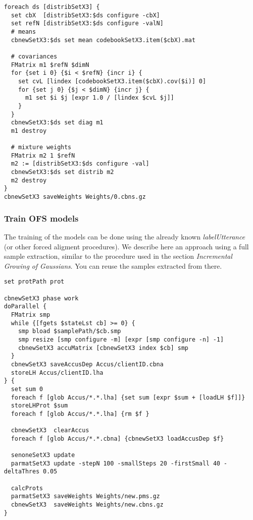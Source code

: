 \begin{verbatim}
foreach ds [distribSetX3] {
  set cbX  [distribSetX3:$ds configure -cbX]
  set refN [distribSetX3:$ds configure -valN]
  # means
  cbnewSetX3:$ds set mean codebookSetX3.item($cbX).mat

  # covariances
  FMatrix m1 $refN $dimN
  for {set i 0} {$i < $refN} {incr i} {
    set cvL [lindex [codebookSetX3.item($cbX).cov($i)] 0]
    for {set j 0} {$j < $dimN} {incr j} {
      m1 set $i $j [expr 1.0 / [lindex $cvL $j]]
    }
  }
  cbnewSetX3:$ds set diag m1
  m1 destroy

  # mixture weights
  FMatrix m2 1 $refN
  m2 := [distribSetX3:$ds configure -val]
  cbnewSetX3:$ds set distrib m2
  m2 destroy
}
cbnewSetX3 saveWeights Weights/0.cbns.gz
\end{verbatim}

\subsubsection{Train OFS models}

The  training of the models can  be done using  the already known {\em
labelUtterance} (or  other  forced aligment procedures).  We  describe
here an  approach   using a full sample    extraction, similar to  the
procedure    used  in   the  section  {\em    Incremental  Growing  of
Gaussians}. You can reuse the samples extracted from there.

\begin{verbatim}
set protPath prot

cbnewSetX3 phase work
doParallel {
  FMatrix smp
  while {[fgets $stateLst cb] >= 0} {
    smp bload $samplePath/$cb.smp
    smp resize [smp configure -m] [expr [smp configure -n] -1]
    cbnewSetX3 accuMatrix [cbnewSetX3 index $cb] smp
  }
  cbnewSetX3 saveAccusDep Accus/clientID.cbna
  storeLH Accus/clientID.lha
} {
  set sum 0
  foreach f [glob Accus/*.*.lha] {set sum [expr $sum + [loadLH $f]]}
  storeLHProt $sum
  foreach f [glob Accus/*.*.lha] {rm $f }

  cbnewSetX3  clearAccus
  foreach f [glob Accus/*.*.cbna] {cbnewSetX3 loadAccusDep $f}

  senoneSetX3 update
  parmatSetX3 update -stepN 100 -smallSteps 20 -firstSmall 40 -deltaThres 0.05

  calcProts
  parmatSetX3 saveWeights Weights/new.pms.gz
  cbnewSetX3  saveWeights Weights/new.cbns.gz
}
\end{verbatim}

